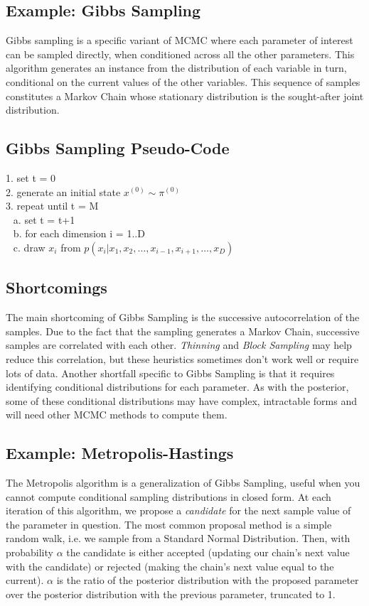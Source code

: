\documentclass{article}
\begin{document}
\subsection{Example: Gibbs Sampling}

Gibbs sampling is a specific variant of MCMC where each parameter of interest can be sampled directly, when conditioned across all the other parameters. This algorithm generates an instance from the distribution of each variable in turn, conditional on the current values of the other variables. This sequence of samples constitutes a Markov Chain whose stationary distribution is the sought-after joint distribution.

\subsection{Gibbs Sampling Pseudo-Code}

1. set t = 0 \\
2. generate an initial state $x^{(0)} \sim \pi^{(0)}$ \\
3. repeat until t = M \\
$~~$ a. set t = t+1 \\
$~~$ b. for each dimension i = 1..D \\
$~~$ c. draw $x_i$ from $p(x_i|x_1,x_2,\dots,x_{i-1},x_{i+1},\dots,x_D)$ \\

\subsection{Shortcomings}

The main shortcoming of Gibbs Sampling is the successive autocorrelation of the samples. Due to the fact that the sampling generates a Markov Chain, successive samples are correlated with each other. \textit{Thinning} and \textit{Block Sampling} may help reduce this correlation, but these heuristics sometimes don't work well or require lots of data. Another shortfall specific to Gibbs Sampling is that it requires identifying conditional distributions for each parameter. As with the posterior, some of these conditional distributions may have complex, intractable forms and will need other MCMC methods to compute them.

\subsection{Example: Metropolis-Hastings}

The Metropolis algorithm is a generalization of Gibbs Sampling, useful when you cannot compute conditional sampling distributions in closed form. At each iteration of this algorithm, we propose a \textit{candidate} for the next sample value of the parameter in question. The most common proposal method is a simple random walk, i.e. we sample from a Standard Normal Distribution. Then, with probability $\alpha$ the candidate is either accepted (updating our chain's next value with the candidate) or rejected (making the chain's next value equal to the current). $\alpha$ is the ratio of the posterior distribution with the proposed parameter over the posterior distribution with the previous parameter, truncated to 1.
\end{document}

